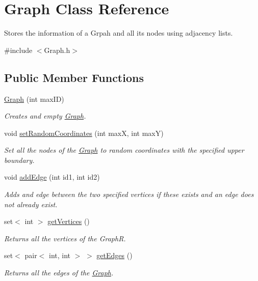 \hypertarget{classGraph}{}\section{Graph Class Reference}
\label{classGraph}


Stores the information of a Grpah and all its nodes using adjacency lists.  




{\ttfamily \#include $<$Graph.\+h$>$}

\subsection*{Public Member Functions}
\begin{DoxyCompactItemize}
\item 
\hyperlink{classGraph_a2d6e8bbe5d266e468dab445de71607ff}{Graph} (int max\+ID)
\begin{DoxyCompactList}\small\item\em Creates and empty \hyperlink{classGraph}{Graph}. \end{DoxyCompactList}\item 
void \hyperlink{classGraph_a0c904fc0ce662301c2ed25b1993ae06e}{set\+Random\+Coordinates} (int maxX, int maxY)
\begin{DoxyCompactList}\small\item\em Set all the nodes of the \hyperlink{classGraph}{Graph} to random coordinates with the specified upper boundary. \end{DoxyCompactList}\item 
void \hyperlink{classGraph_acbe5b7cf2a17849a3c8385890c556625}{add\+Edge} (int id1, int id2)
\begin{DoxyCompactList}\small\item\em Adds and edge between the two specified vertices if these exists and an edge does not already exist. \end{DoxyCompactList}\item 
set$<$ int $>$ \hyperlink{classGraph_a4acd450439bb4209953c10ac45ad47b2}{get\+Vertices} ()
\begin{DoxyCompactList}\small\item\em Returns all the vertices of the GraphR. \end{DoxyCompactList}\item 
set$<$ pair$<$ int, int $>$ $>$ \hyperlink{classGraph_a2e4fed16e6046a6274cf317c794cc0c3}{get\+Edges} ()
\begin{DoxyCompactList}\small\item\em Returns all the edges of the \hyperlink{classGraph}{Graph}. \end{DoxyCompactList}\item 

\end{DoxyCompactItemize}

